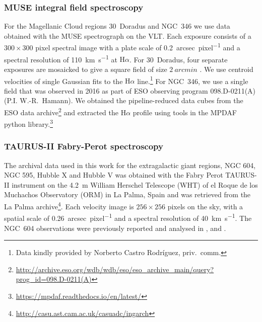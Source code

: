 \documentclass[fleqn,usenatbib, useAMS, a4paper]{mnras}
\newcommand\ha{\ensuremath{\text{H}\alpha}}
\begin{document}
\subsubsection{MUSE integral field spectroscopy}
\label{sec:muse-integral-field}

For the Magellanic Cloud regions 30~Doradus and NGC~346 we use data obtained
with the MUSE spectrograph \citep{Bacon:2010a, Bacon:2014a} on the VLT.\@
Each exposure consists of a \(300 \times 300\) pixel spectral image with a plate scale
of \SI{0.2}{arcsec.pixel^{-1}} and a spectral resolution of \SI{110}{km.s^{-1}}
at \ha{}.
For 30~Doradus, four separate exposures are mosaicked to give a square field of
size \(\SI{2}{arcmin}\) \citep{Castro:2018a}. 
We use centroid velocities of single Gaussian fits to the \ha{} line.\footnote{%
  Data kindly provided by Norberto Castro Rodríguez, priv.~comm.
}
For NGC~346, we use a single field that was observed in 2016 as part of
ESO observing program 098.D-0211(A) (P.I. W.-R.~Hamann).
We obtained the pipeline-reduced data cubes from the ESO data archive\footnote{%
  \url{http://archive.eso.org/wdb/wdb/eso/eso_archive_main/query?prog_id=098.D-0211(A)}
}
and extracted the \ha{} profile using tools in the MPDAF python library.\footnote{
  \url{https://mpdaf.readthedocs.io/en/latest/}
} 

\subsubsection{TAURUS-II Fabry-Perot spectroscopy}
\label{sec:taurus-ii-fabry}

The archival data used in this work for the extragalactic giant regions, NGC 604, NGC 595, Hubble X and Hubble V was obtained with the Fabry Perot TAURUS-II instrument
\citep{Gordon:2000v}
on the \SI{4.2}{m} William Herschel Telescope (WHT) of
el Roque de los Muchachos Observatory (ORM) in La Palma, Spain
and was retrieved from the La Palma archive\footnote{\url{http://casu.ast.cam.ac.uk/casuadc/ingarch}}.
Each velocity image is \(256 \times 256\) pixels on the sky,
with a spatial scale of \SI{0.26}{arcsec.pixel^{-1}}
and a spectral resolution of \SI{40}{km.s^{-1}}.
The NGC~604 observations were previously reported and analysed in
\citet{sabalisck1995supersonic}, \citet{Medina-Tanco:1997a} and \citet{Melnick:2021x}.

\end{document}
